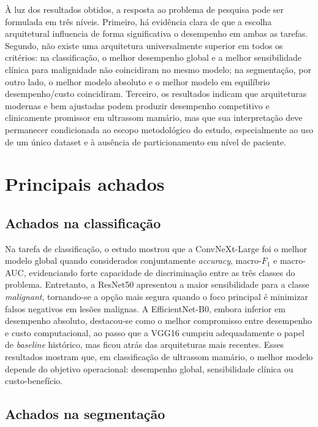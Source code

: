 \documentclass[tcc,capa]{texufpel}
\begin{document}
À luz dos resultados obtidos, a resposta ao problema de pesquisa pode ser formulada em três níveis. Primeiro, há evidência clara de que a escolha arquitetural influencia de forma significativa o desempenho em ambas as tarefas. Segundo, não existe uma arquitetura universalmente superior em todos os critérios: na classificação, o melhor desempenho global e a melhor sensibilidade clínica para malignidade não coincidiram no mesmo modelo; na segmentação, por outro lado, o melhor modelo absoluto e o melhor modelo em equilíbrio desempenho/custo coincidiram. Terceiro, os resultados indicam que arquiteturas modernas e bem ajustadas podem produzir desempenho competitivo e clinicamente promissor em ultrassom mamário, mas que sua interpretação deve permanecer condicionada ao escopo metodológico do estudo, especialmente ao uso de um único dataset e à ausência de particionamento em nível de paciente. 

\section{Principais achados}

\subsection{Achados na classificação}

Na tarefa de classificação, o estudo mostrou que a ConvNeXt-Large foi o melhor modelo global quando considerados conjuntamente \textit{accuracy}, macro-\(F_1\) e macro-AUC, evidenciando forte capacidade de discriminação entre as três classes do problema. Entretanto, a ResNet50 apresentou a maior sensibilidade para a classe \textit{malignant}, tornando-se a opção mais segura quando o foco principal é minimizar falsos negativos em lesões malignas. A EfficientNet-B0, embora inferior em desempenho absoluto, destacou-se como o melhor compromisso entre desempenho e custo computacional, ao passo que a VGG16 cumpriu adequadamente o papel de \textit{baseline} histórico, mas ficou atrás das arquiteturas mais recentes. Esses resultados mostram que, em classificação de ultrassom mamário, o melhor modelo depende do objetivo operacional: desempenho global, sensibilidade clínica ou custo-benefício. 

\subsection{Achados na segmentação}
\end{document}
